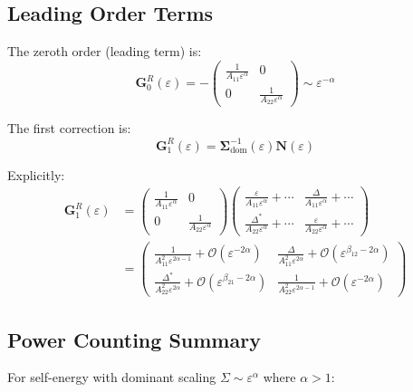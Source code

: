 \documentclass[12pt]{article}
\begin{document}
\subsection{Leading Order Terms}

The zeroth order (leading term) is:
\begin{equation}
\boxed{
\mathbf{G}^R_0(\varepsilon) = -\begin{pmatrix}
\frac{1}{A_{11} \varepsilon^\alpha} & 0 \\
0 & \frac{1}{A_{22} \varepsilon^\alpha}
\end{pmatrix} \sim \varepsilon^{-\alpha}
}
\end{equation}

The first correction is:
\begin{equation}
\mathbf{G}^R_1(\varepsilon) = \mathbf{\Sigma}_{\text{dom}}^{-1}(\varepsilon) \mathbf{N}(\varepsilon)
\end{equation}

Explicitly:
\begin{align}
\mathbf{G}^R_1(\varepsilon) &= \begin{pmatrix}
\frac{1}{A_{11} \varepsilon^\alpha} & 0 \\
0 & \frac{1}{A_{22} \varepsilon^\alpha}
\end{pmatrix} \begin{pmatrix}
\frac{\varepsilon}{A_{11}\varepsilon^\alpha} + \cdots & \frac{\Delta}{A_{11}\varepsilon^\alpha} + \cdots \\
\frac{\Delta^*}{A_{22}\varepsilon^\alpha} + \cdots & \frac{\varepsilon}{A_{22}\varepsilon^\alpha} + \cdots
\end{pmatrix} \\
&= \begin{pmatrix}
\frac{1}{A_{11}^2\varepsilon^{2\alpha-1}} + \mathcal{O}(\varepsilon^{-2\alpha}) & \frac{\Delta}{A_{11}^2\varepsilon^{2\alpha}} + \mathcal{O}(\varepsilon^{\beta_{12}-2\alpha}) \\
\frac{\Delta^*}{A_{22}^2\varepsilon^{2\alpha}} + \mathcal{O}(\varepsilon^{\beta_{21}-2\alpha}) & \frac{1}{A_{22}^2\varepsilon^{2\alpha-1}} + \mathcal{O}(\varepsilon^{-2\alpha})
\end{pmatrix}
\end{align}

\subsection{Power Counting Summary}

For self-energy with dominant scaling $\Sigma \sim \varepsilon^\alpha$ where $\alpha > 1$:
\end{document}
